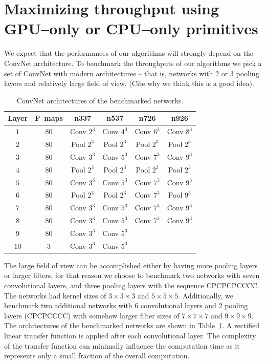 \documentclass[conference]{./IEEEtran/IEEEtran}
\begin{document}
\section{Maximizing throughput using GPU--only or CPU--only primitives}

  We expect that the performances of our algorithms will strongly
  depend on the ConvNet architecture.  To benchmark the throughputs of
  our algorithms we pick a set of ConvNet with modern architectures --
  that is, networks with 2 or 3 pooling layers and relatively large
  field of view. (Cite why we think this is a good idea).

  \begin{table}
    \centering
    \begin{tabular}{cccccc}
      \toprule
      Layer & F--maps & n337    & n537  &  n726  &  n926 \\
      \midrule
      $1$ & 80 &  Conv $2^3$  & Conv $4^3$  & Conv $6^3$  & Conv $8^3$ \\
      $2$ & 80 &  Pool $2^3$  & Pool $2^3$  & Pool $2^3$  & Pool $2^3$ \\
      $3$ & 80 &  Conv $3^3$  & Conv $5^3$  & Conv $7^3$  & Conv $9^3$ \\
      $4$ & 80 &  Pool $2^3$  & Pool $2^3$  & Pool $2^3$  & Pool $2^3$ \\
      $5$ & 80 &  Conv $3^3$  & Conv $5^3$  & Conv $7^3$  & Conv $9^3$ \\
      $6$ & 80 &  Pool $2^3$  & Pool $2^3$  & Conv $7^3$  & Pool $9^3$ \\
      $7$ & 80 &  Conv $3^3$  & Conv $5^3$  & Conv $7^3$  & Conv $9^3$ \\
      $8$ & 80 &  Conv $3^3$  & Conv $5^3$  & Conv $7^3$  & Conv $9^3$ \\
      $9$ & 80 & Conv $3^3$  & Conv $5^3$  & & \\
      $10$ & 3 & Conv $3^3$  & Conv $5^3$  & & \\
      \bottomrule
    \end{tabular}
    \caption{ConvNet architectures of the benchmarked networks.}
    \label{table:benchmarked_networks}
  \end{table}

  The large field of view can be accomplished either by having more
  pooling layers or larger filters, for that reason we choose to
  benchmark two networks with seven convolutional layers, and three
  pooling layers with the sequence CPCPCPCCCC.  The networks had
  kernel sizes of $3\times 3 \times 3$ and $5\times 5\times 5$.
  Additionally, we benchmark two additional networks with 6
  convolutional layers and 2 pooling layers (CPCPCCCC) with somehow
  larger filter sizes of $7 \times 7 \times 7$ and $9 \times 9 \times
  9$.  The architectures of the benchmarked networks are shown in
  Table~\ref{table:benchmarked_networks}.  A rectified linear
  transfer function is applied after each convolutional layer.  The
  complexity of the transfer function can minimally influence the
  computation time as it represents only a small fraction of the
  overall computation.
\end{document}
